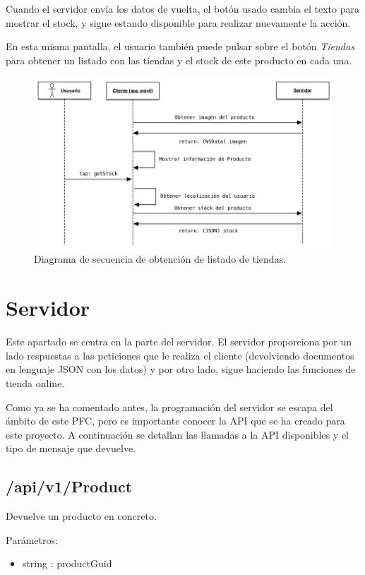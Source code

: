 Cuando el servidor envía los datos de vuelta, el botón usado cambia el texto para mostrar el stock, y sigue estando disponible para realizar nuevamente la acción.

En esta misma pantalla, el usuario también puede pulsar sobre el botón \emph{Tiendas} para obtener un listado con las tiendas y el stock de este producto en cada una.

\begin{figure}[H]
	\centering
		\includegraphics[width=1\textwidth]{./img/diagrama-get-stock.png}
	\caption{Diagrama de secuencia de obtención de listado de tiendas.}
	\label{fig:diagrama-tiendas}
\end{figure}

\section{Servidor}
Este apartado se centra en la parte del servidor. El servidor proporciona por un lado respuestas a las peticiones que le realiza el cliente (devolviendo documentos en lenguaje JSON con los datos) y por otro lado, sigue haciendo las funciones de tienda online.

Como ya se ha comentado antes, la programación del servidor se escapa del ámbito de este PFC, pero es importante conocer la API que se ha creado para este proyecto. A continuación se detallan las llamadas a la API disponibles y el tipo de mensaje que devuelve.

\subsection{/api/v1/Product}
Devuelve un producto en concreto.

Parámetros:
\begin{itemize}
	\item string : productGuid
\end{itemize}

